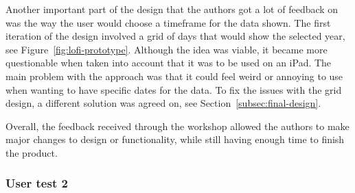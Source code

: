 Another important part of the design that the authors got a lot of feedback on was the way the user would choose a
timeframe for the data shown.
The first iteration of the design involved a grid of days that would show the selected year,
see Figure~\ref{fig:lofi-prototype}.
Although the idea was viable, it became more questionable when taken into account that it was to be used on an iPad.
The main problem with the approach was that it could feel weird or annoying to use when wanting to have specific dates
for the data.
To fix the issues with the grid design, a different solution was agreed on, see Section~\ref{subsec:final-design}.

Overall, the feedback received through the workshop allowed the authors to make major changes to design or
functionality, while still having enough time to finish the product.

\subsubsection{User test 2}\label{subsubsec:user-test-2}

